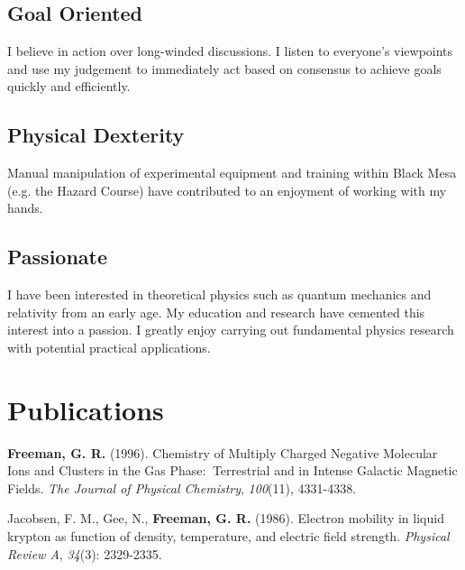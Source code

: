 \documentclass[
	10pt, %
]{FreemanCV}
\begin{document}
\begin{paracol}{2}
\subsection{Goal Oriented}

I believe in action over long-winded discussions. I listen to everyone's viewpoints and use my judgement to immediately act based on consensus to achieve goals quickly and efficiently.

\subsection{Physical Dexterity}

Manual manipulation of experimental equipment and training within Black Mesa (e.g. the Hazard Course) have contributed to an enjoyment of working with my hands.

\subsection{Passionate}

I have been interested in theoretical physics such as quantum mechanics and relativity from an early age. My education and research have cemented this interest into a passion. I greatly enjoy carrying out fundamental physics research with potential practical applications.


\section{Publications}


\textbf{Freeman, G. R.} (1996). Chemistry of Multiply Charged Negative Molecular Ions and Clusters in the Gas Phase:  Terrestrial and in Intense Galactic Magnetic Fields. \textit{The Journal of Physical Chemistry}, \textit{100}(11), 4331-4338.

\medskip %

Jacobsen, F. M., Gee, N., \textbf{Freeman, G. R.} (1986). Electron mobility in liquid krypton as function of density, temperature, and electric field strength. \textit{Physical Review A}, \textit{34}(3): 2329-2335.

\medskip %


\end{paracol}
\end{document}
